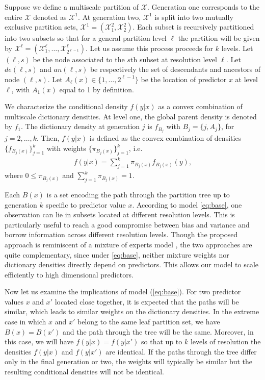\documentclass{article}
\begin{document}
Suppose we define a multiscale partition of $\mathcal{X}$.  Generation one corresponds to the entire $\mathcal{X}$ denoted as $\mathcal{X}^1$.  At generation two, $\mathcal{X}^1$ is split into two mutually exclusive partition sets, $\mathcal{X}^1=\left(\mathcal{X}^2_1, \mathcal{X}^2_2\right)$. Each subset is recursively partitioned into two subsets so that for a general partition level $\ell$ the partition will be given by $\mathcal{X}^{\ell}=\left(\mathcal{X}^{\ell}_1, \ldots, \mathcal{X}^{\ell}_{2^{\ell-1}}\right)$.  Let us assume this process proceeds for $k$ levels. Let $(\ell,s)$ be the node associated to the $s$th subset at resolution level $\ell$. Let $de(\ell,s)$ and $an(\ell,s)$ be respectively the set of descendants and ancestors of node $(\ell, s)$. Let $A_{\ell}(x) \in \{1, \ldots, 2^{\ell-1}\}$ be the location of predictor $x$ at level $\ell$, with $A_1(x)$ equal to 1 by definition. 

We characterize the conditional density $f(y|x)$ as a convex combination of multiscale dictionary densities.  At level one, the global parent density is denoted by $f_1$. The dictionary density at generation $j$ is $f_{B_j}$ with $B_j=\{j,A_j\}$, for $j=2,\ldots, k$. Then, $f(y|x)$ is defined as the convex combination of densities $\{f_{B_j(x)}\}_{j=1}^k$ with weights $\{\pi_{B_j(x)} \}_{j=1}^k$, i.e.
\begin{eqnarray}
f(y|x) = \sum_{j=1}^k \pi_{B_j(x)} f_{B_j(x)}(y),  \label{eq:base}
\end{eqnarray}
where $0 \le \pi_{B_j(x)}$ and $\sum_{j=1}^k \pi_{B_j(x)}=1$. 

Each $B(x)$ is a set encoding the path through the partition tree up to generation $k$ specific to predictor value $x$. According to model \eqref{eq:base}, one observation can lie in subsets located at different resolution levels. This is particularly useful to reach a good compromise between bias and variance and borrow information across different resolution levels. Though the proposed approach is reminiscent of a mixture of experts model \cite{mixtureexperts}, the two approaches are quite complementary, since under \eqref{eq:base}, neither mixture weights nor dictionary densities directly depend on predictors. This allows our model to scale efficiently to high dimensional predictors.

Now let us examine the implications of model (\ref{eq:base}). For two predictor values $x$ and $x'$ located close together, it is expected that the paths will be similar, which leads to similar weights on the dictionary densities.  In the extreme case in which $x$ and $x'$ belong to the same leaf partition set, we have $B(x) = B(x')$ and the path through the tree will be the same.  Moreover, in this case, we will have $f(y|x)=f(y|x')$ so that up to $k$ levels of resolution the densities $f(y|x)$ and $f(y|x')$ are identical.  If the paths through the tree differ only in the final generation or two, the weights will typically be similar but the resulting conditional densities will not be identical. 
\end{document}
